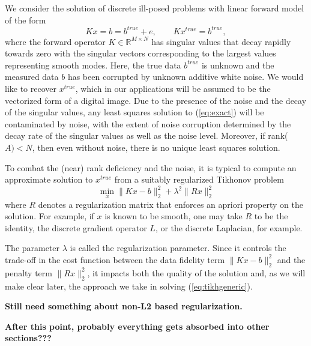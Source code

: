 We consider the solution of discrete ill-posed problems with linear forward model of the form~\cite{Hansenbk}
\begin{equation} \label{eq:exact} K x = b = b^{true} + e,  \qquad Kx^{true} = b^{true},\end{equation} 
where the forward operator $K \in \mathbb{R}^{M \times N}$ has singular values that decay 
rapidly towards zero with the singular vectors corresponding to the largest values representing smooth modes.  Here, the true data $b^{true}$ is unknown and the measured data $b$ has been corrupted by
unknown additive white noise.   We would like to recover $x^{true}$, which in our applications 
will be assumed to be the vectorized form of a digital image.   Due to the presence of the noise and the 
decay of the singular values, any least squares solution to (\ref{eq:exact}) will be contaminated by
noise, with the extent of noise corruption determined by the decay rate of the singular values as well as the noise level.  Moreover, if rank($A)< N$, then even without noise, there is no unique least squares solution.  

To combat the (near) rank deficiency and the noise, it is typical to compute an approximate solution to $x^{true}$ from a suitably regularized Tikhonov \cite{Tikhonov} problem
\begin{equation}   \label{eq:tikhgeneric} \min_{x} \| K x - b \|_2^2 + \lambda^2 \| R x \|_2^2  \end{equation}
where $R$ denotes a regularization matrix that enforces an apriori property on the solution.   For example, if 
$x$ is known to be smooth, one may take $R$ to be the identity, the discrete gradient operator $L$, or the discrete Laplacian, for example.  

The parameter $\lambda$ is called the regularization parameter.  Since it controls the trade-off in the cost function between the data fidelity term $\| K x - b \|_2^2$ and the penalty term $\| R x \|_2^2$, it impacts  
both the quality of the solution and, as we will make clear later, the approach we take in solving (\ref{eq:tikhgeneric}).

{\bf Still need something about non-L2 based regularization.}

{\bf After this point, probably everything gets absorbed into other
sections???}

